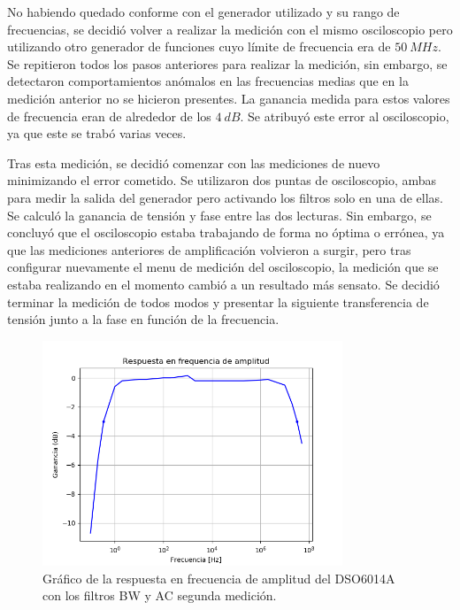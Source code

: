 \documentclass[11pt, a4paper]{article}
\begin{document}
No habiendo quedado conforme con el generador utilizado y su rango de frecuencias, se decidió volver a realizar la medición con el mismo osciloscopio pero utilizando otro generador de funciones cuyo límite de frecuencia era de $50 \ MHz$. Se repitieron todos los pasos anteriores para realizar la medición, sin embargo, se detectaron comportamientos anómalos en las frecuencias medias que en la medición anterior no se hicieron presentes. La ganancia medida para estos valores de frecuencia eran de alrededor de los $4 \ dB$. Se atribuyó este error al osciloscopio, ya que este se trabó varias veces.

Tras esta medición, se decidió comenzar con las mediciones de nuevo minimizando el error cometido. Se utilizaron dos puntas de osciloscopio, ambas para medir la salida del generador pero activando los filtros solo en una de ellas. Se calculó la ganancia de tensión y fase entre las dos lecturas. Sin embargo, se concluyó que el osciloscopio estaba trabajando de forma no óptima o errónea, ya que las mediciones anteriores de amplificación volvieron a surgir, pero tras configurar nuevamente el menu de medición del osciloscopio, la medición que se estaba realizando en el momento cambió a un resultado más sensato. Se decidió terminar la medición de todos modos y presentar la siguiente transferencia de tensión junto a la fase en función de la frecuencia.

\begin{figure}[H]
	\centering
	\includegraphics[width=0.8\textwidth]{resp_freq_osci1.png}
	\caption{Gráfico de la respuesta en frecuencia de amplitud del DSO6014A con los filtros BW y AC segunda medición.}  
	\label{graf:resp_freq_osci1}
\end{figure}
\end{document}
